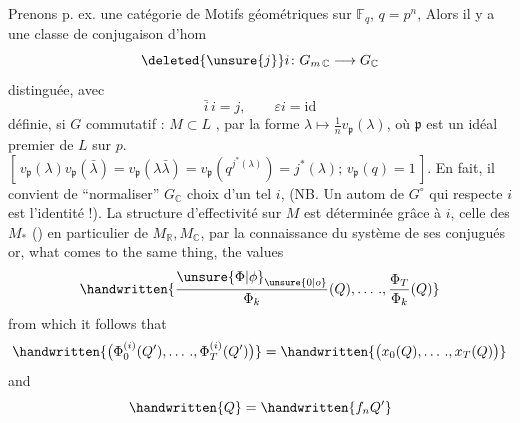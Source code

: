 Prenons p. ex. une catégorie de Motifs
géométriques sur $\mathbb F_q$, $q=p^n$,  Alors 
il y a une classe de conjugaison d'hom
\[
\deleted{\unsure{j}}i\colon G_{m\,\mathbb C}\longrightarrow G_{\mathbb C}
\]
distinguée, avec
\[
\bar i\,i=j,\qquad \varepsilon i=\mathrm{id}
\]
définie,  si $G$ commutatif : $M\subset L$ ,
par la forme $\lambda\mapsto\frac1n v_{\mathfrak p}(\lambda)$, où $\mathfrak p$ est un
idéal premier de $L$ sur $p$. $[\,v_{\mathfrak p}(\lambda)v_{\mathfrak p}(\bar\lambda)=
v_{\mathfrak p}(\lambda\bar\lambda)=v_{\mathfrak p}(q^{j^*(\lambda)})=j^*(\lambda);\,v_{\mathfrak p}(q)=1\,]$.
En fait, il convient de ``normaliser'' $G_{\mathbb C}$ choix
d'un tel $i$, (NB. Un autom de $G^\circ$  qui 
respecte $i$ est l'identité !). La structure d'effectivité
sur $M$ est déterminée grâce à $i$, celle
des $M_*$ () en particulier de $M_{\mathbb R},M_{\mathbb C}$,
par la connaissance du système de ses conjugués
or, what comes to the same thing, the values
\[
\handwritten{\frac{\unsure{\Phi|\phi}_{\unsure{0|o}}}{\Phi_k}(Q),\ldots\,.,\frac{\Phi_T}{\Phi_k}(Q)}
\]
from which it follows that
\[
\handwritten{\bigl(\Phi_0^{(i)}(Q'),\ldots\,.,\Phi_T^{(i)}(Q')\bigr)}=\handwritten{\bigl(x_0(Q),\ldots\,.,x_T(Q)\bigr)}
\]
and
\[
\handwritten{Q}=\handwritten{f_nQ'}
\]

